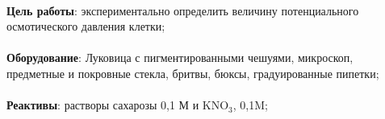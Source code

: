 


\begin{footnotesize}

\paragraph*{}\textbf{Цель работы}: экспериментально определить величину потенциального осмотического давления клетки;

\paragraph*{}\textbf{Оборудование}: Луковица с пигментированными чешуями, микроскоп, предметные и покровные стекла, бритвы, бюксы, градуированные пипетки;

\paragraph*{}\textbf{Реактивы}: растворы сахарозы 0,1 М и KNO$_3$, 0,1M;

\end{footnotesize}


